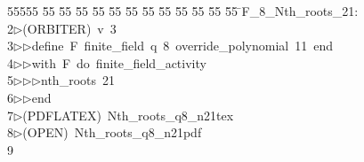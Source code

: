 %
%
\begin{tabbing}
55555 \= 55 \= 55 \= 55 \= 55 \= 55 \= 55 \= 55 \= 55 \= 55 \= 55 \= 55 \= 55 \= \>F\_8\_Nth\_roots\_21:\\[0pt]
2\>$\triangleright$\>(ORBITER)\ v\ 3\ \\[0pt]
3\>$\triangleright$\>$\triangleright$\>define\ F\ finite\_field\ q\ 8\ override\_polynomial\ 11\ end\ \\[0pt]
4\>$\triangleright$\>$\triangleright$\>with\ F\ do\ finite\_field\_activity\ \\[0pt]
5\>$\triangleright$\>$\triangleright$\>$\triangleright$\>nth\_roots\ 21\ \\[0pt]
6\>$\triangleright$\>$\triangleright$\>end\\[0pt]
7\>$\triangleright$\>(PDFLATEX)\ Nth\_roots\_q8\_n21tex\\[0pt]
8\>$\triangleright$\>(OPEN)\ Nth\_roots\_q8\_n21pdf\\[0pt]
9\>\end{tabbing}
